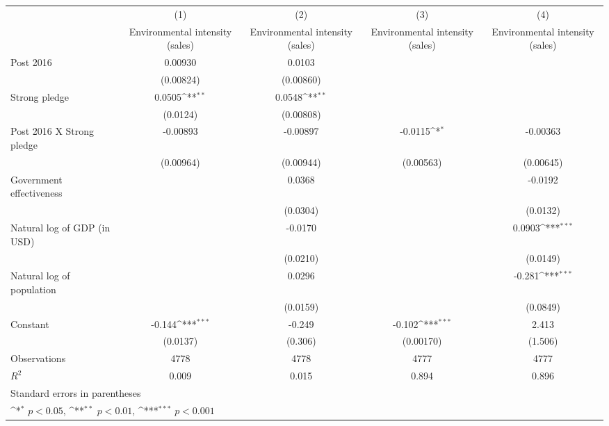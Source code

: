 {
\def\sym#1{\ifmmode^{#1}\else\(^{#1}\)\fi}
\begin{tabular}{l*{4}{c}}
\hline\hline
                    &\multicolumn{1}{c}{(1)}&\multicolumn{1}{c}{(2)}&\multicolumn{1}{c}{(3)}&\multicolumn{1}{c}{(4)}\\
                    &\multicolumn{1}{c}{Environmental intensity (sales)}&\multicolumn{1}{c}{Environmental intensity (sales)}&\multicolumn{1}{c}{Environmental intensity (sales)}&\multicolumn{1}{c}{Environmental intensity (sales)}\\
\hline
Post 2016           &     0.00930         &      0.0103         &                     &                     \\
                    &   (0.00824)         &   (0.00860)         &                     &                     \\
[1em]
Strong pledge       &      0.0505\sym{**} &      0.0548\sym{**} &                     &                     \\
                    &    (0.0124)         &   (0.00808)         &                     &                     \\
[1em]
Post 2016 X Strong pledge&    -0.00893         &    -0.00897         &     -0.0115\sym{*}  &    -0.00363         \\
                    &   (0.00964)         &   (0.00944)         &   (0.00563)         &   (0.00645)         \\
[1em]
Government effectiveness&                     &      0.0368         &                     &     -0.0192         \\
                    &                     &    (0.0304)         &                     &    (0.0132)         \\
[1em]
Natural log of GDP (in USD)&                     &     -0.0170         &                     &      0.0903\sym{***}\\
                    &                     &    (0.0210)         &                     &    (0.0149)         \\
[1em]
Natural log of population&                     &      0.0296         &                     &      -0.281\sym{***}\\
                    &                     &    (0.0159)         &                     &    (0.0849)         \\
[1em]
Constant            &      -0.144\sym{***}&      -0.249         &      -0.102\sym{***}&       2.413         \\
                    &    (0.0137)         &     (0.306)         &   (0.00170)         &     (1.506)         \\
\hline
Observations        &        4778         &        4778         &        4777         &        4777         \\
\(R^{2}\)           &       0.009         &       0.015         &       0.894         &       0.896         \\
\hline\hline
\multicolumn{5}{l}{\footnotesize Standard errors in parentheses}\\
\multicolumn{5}{l}{\footnotesize \sym{*} \(p<0.05\), \sym{**} \(p<0.01\), \sym{***} \(p<0.001\)}\\
\end{tabular}
}
